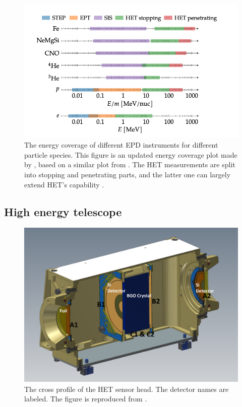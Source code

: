 \begin{figure}
    \centering
    \includegraphics[width = \textwidth]{images/EPD_coverage.png}
    \caption[The energy coverage of \ac{EPD} instruments]{The energy coverage of different \ac{EPD} instruments for different particle species. This figure is an updated energy coverage plot made by \citet{JohanPhd2020}, based on a similar plot from \citet{RodriguezPacheco-2019-EPD}. The HET measurements are split into stopping and penetrating parts, and the latter one can largely extend \ac{HET}'s capability \citep{Elftmann-2020-PhD}.}
    \label{Fig:EPD-energy-coverage}
\end{figure}  

\subsection*{High energy telescope}

\begin{figure}
    \centering
    \includegraphics[width = \textwidth]{images/het.png}
    \caption[The \ac{HET} sensor head]{The cross profile of the \ac{HET} sensor head. The detector names are labeled. The figure is reproduced from \citet{RodriguezPacheco-2019-EPD}.}
    \label{fig:HET-sensor-head}
\end{figure}

